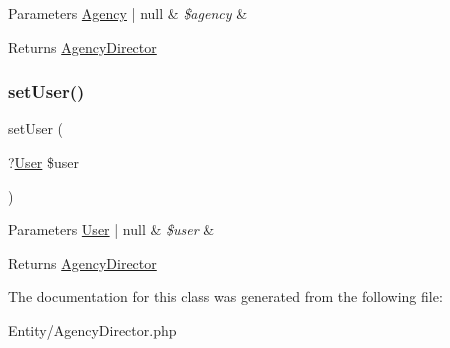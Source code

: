 \begin{DoxyParams}[1]{Parameters}
\mbox{\hyperlink{class_app_1_1_entity_1_1_agency}{Agency}} | null & {\em \$agency} & \\
\hline
\end{DoxyParams}
\begin{DoxyReturn}{Returns}
\mbox{\hyperlink{class_app_1_1_entity_1_1_agency_director}{Agency\+Director}} 
\end{DoxyReturn}
\mbox{\label{class_app_1_1_entity_1_1_agency_director_a406a111868b45aad6d4c8ab5b0c5bcb9}} 
\subsubsection{\texorpdfstring{setUser()}{setUser()}}
{\footnotesize\ttfamily set\+User (\begin{DoxyParamCaption}\item[{?\mbox{\hyperlink{class_app_1_1_entity_1_1_user}{User}}}]{\$user }\end{DoxyParamCaption})}


\begin{DoxyParams}[1]{Parameters}
\mbox{\hyperlink{class_app_1_1_entity_1_1_user}{User}} | null & {\em \$user} & \\
\hline
\end{DoxyParams}
\begin{DoxyReturn}{Returns}
\mbox{\hyperlink{class_app_1_1_entity_1_1_agency_director}{Agency\+Director}} 
\end{DoxyReturn}


The documentation for this class was generated from the following file\+:\begin{DoxyCompactItemize}
\item 
Entity/Agency\+Director.\+php\end{DoxyCompactItemize}
